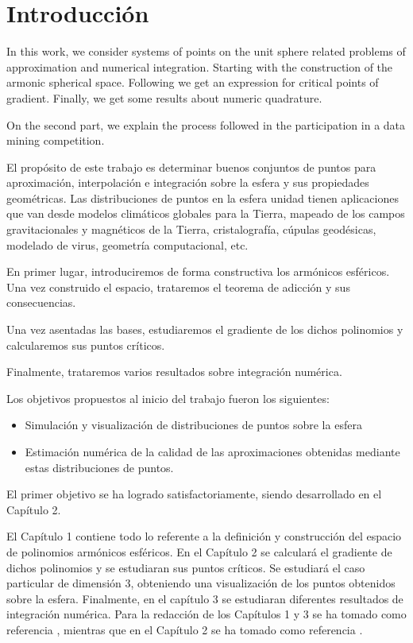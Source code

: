 \chapter*{Introducción}

In this work, we consider systems of points on the unit sphere related problems of approximation and numerical integration. Starting with the construction of the armonic spherical space. Following we get an expression for critical points of gradient. Finally, we get some results about numeric quadrature.

On the second part, we explain the process followed in the participation in a data mining competition. 

\bigskip 

El propósito de este trabajo es determinar buenos conjuntos de puntos para aproximación, interpolación e integración sobre la esfera y sus propiedades geométricas. Las distribuciones de puntos en la esfera unidad tienen aplicaciones que van desde modelos climáticos globales para la  Tierra, mapeado de los campos gravitacionales y magnéticos de la Tierra, cristalografía, cúpulas geodésicas, modelado de virus, geometría computacional, etc.
 
\medskip

En primer lugar, introduciremos de forma constructiva los armónicos esféricos. Una vez construido el espacio, trataremos el teorema de adicción y sus consecuencias. 

Una vez asentadas las bases, estudiaremos el gradiente de los dichos polinomios y calcularemos sus puntos críticos.

Finalmente, trataremos varios resultados sobre integración numérica.
\medskip

Los objetivos propuestos al inicio del trabajo fueron los siguientes:
\begin{itemize}
	\item Simulación y visualización de distribuciones de puntos sobre la esfera
	\item Estimación numérica de la calidad de las aproximaciones obtenidas mediante estas distribuciones de puntos. 
\end{itemize}

El primer objetivo se ha logrado satisfactoriamente, siendo desarrollado en el Capítulo 2.

\medskip
El Capítulo 1 contiene todo lo referente a la definición y construcción del espacio de polinomios armónicos esféricos.
En el Capítulo 2 se calculará el gradiente de dichos polinomios y se estudiaran sus puntos críticos. Se estudiará el caso particular de dimensión 3, obteniendo una visualización de los puntos obtenidos sobre la esfera.
Finalmente, en el capítulo 3 se estudiaran diferentes resultados de integración numérica.
Para la redacción de los Capítulos 1 y 3 se ha tomado como referencia \cite{libro_esfarm}, mientras que en el Capítulo 2 se ha tomado como referencia \cite{art_grad}.